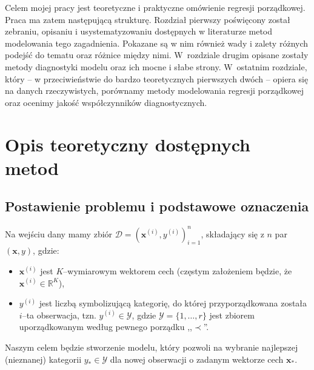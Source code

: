 \documentclass{mini}
\begin{document}
Celem mojej pracy jest teoretyczne i praktyczne omówienie regresji porządkowej. Praca ma zatem następującą strukturę. Rozdział pierwszy poświęcony został zebraniu, opisaniu i usystematyzowaniu dostępnych w literaturze metod modelowania tego zagadnienia. Pokazane są w nim również wady i zalety różnych podejść do tematu oraz różnice między nimi. W~rozdziale drugim opisane zostały metody diagnostyki modelu oraz ich mocne i słabe strony. W~ostatnim rozdziale, który -- w przeciwieństwie do bardzo teoretycznych pierwszych dwóch -- opiera się na danych rzeczywistych, porównamy metody modelowania regresji porządkowej oraz ocenimy jakość współczynników diagnostycznych.       


%


\chapter{Opis teoretyczny dostępnych metod}


\section{Postawienie problemu i podstawowe oznaczenia}

Na wejściu dany mamy zbiór $\mathcal{D} = (\mathbf{x}^{(i)}, y^{(i)})_{i=1}^n$, składający się z $n$ par $(\mathbf{x}, y)$, gdzie:
\begin{itemize}
\item $\mathbf{x}^{(i)}$ jest $K$--wymiarowym wektorem cech (częstym założeniem będzie, że $\mathbf{x}^{(i)}\in \mathbb{R}^K$),  
\item $y^{(i)}$ jest liczbą symbolizującą kategorię, do której przyporządkowana została $i$--ta obserwacja, tzn. $y^{(i)}\in\mathcal{Y}$, gdzie $\mathcal{Y} = \lbrace 1,\ldots ,r \rbrace$ jest zbiorem uporządkowanym według pewnego porządku ,,$\prec$''. 
\end{itemize}
Naszym celem będzie stworzenie modelu, który pozwoli na wybranie najlepszej (nieznanej) kategorii $y_{\ast}\in\mathcal{Y}$ dla nowej obserwacji o zadanym wektorze cech $\mathbf{x}_{\ast}$. 
\end{document}
